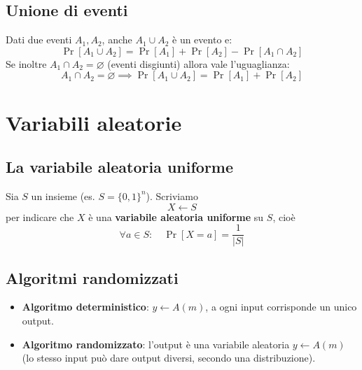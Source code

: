 
\subsection{Unione di eventi}
Dati due eventi $A_1, A_2$, anche $A_1 \cup A_2$ è un evento e:
\[
  \Pr[A_1 \cup A_2] = \Pr[A_1] + \Pr[A_2] - \Pr[A_1 \cap A_2]
\]
Se inoltre $A_1 \cap A_2 = \varnothing$ (eventi disgiunti) allora vale l'uguaglianza:
\[
  A_1 \cap A_2 = \varnothing \implies \Pr[A_1 \cup A_2] = \Pr[A_1] + \Pr[A_2]
\]

\section{Variabili aleatorie}



\subsection{La variabile aleatoria uniforme}
Sia $S$ un insieme (es. $S = \{0,1\}^n$). Scriviamo
\[
  X \leftarrow S
\]
per indicare che $X$ è una \textbf{variabile aleatoria uniforme} su $S$, cioè
\[
  \forall a \in S : \quad \Pr[X = a] = \frac{1}{|S|}
\]

\subsection{Algoritmi randomizzati}
\begin{itemize}
  \item \textbf{Algoritmo deterministico}: $y \leftarrow A(m)$, a ogni input corrisponde un unico output.
  \item \textbf{Algoritmo randomizzato}: l'output è una variabile aleatoria $y \leftarrow A(m)$ (lo stesso input può dare output diversi, secondo una distribuzione).
\end{itemize}

